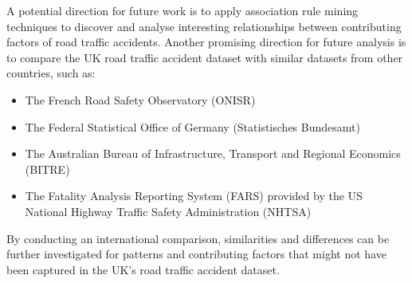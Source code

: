 A potential direction for future work is to apply association rule mining techniques to discover and analyse interesting relationships between contributing factors of road traffic accidents.
Another promising direction for future analysis is to compare the UK road traffic accident dataset with similar datasets from other countries, such as:
\begin{itemize}
    \item The French Road Safety Observatory (ONISR)
    \item The Federal Statistical Office of Germany (Statistisches Bundesamt)
    \item The Australian Bureau of Infrastructure, Transport and Regional Economics (BITRE)
    \item The Fatality Analysis Reporting System (FARS) provided by the US National Highway Traffic Safety Administration (NHTSA)
\end{itemize}

By conducting an international comparison, similarities and differences can be further investigated for patterns and contributing factors that might not have been captured in the UK's road traffic accident dataset.
